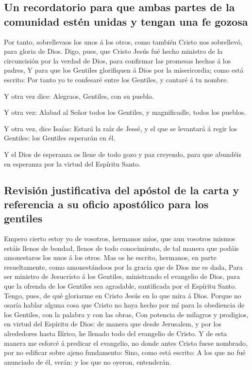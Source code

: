 \hypertarget{un-recordatorio-para-que-ambas-partes-de-la-comunidad-estuxe9n-unidas-y-tengan-una-fe-gozosa}{%
\subsection{Un recordatorio para que ambas partes de la comunidad estén
unidas y tengan una fe
gozosa}\label{un-recordatorio-para-que-ambas-partes-de-la-comunidad-estuxe9n-unidas-y-tengan-una-fe-gozosa}}

 Por tanto, sobrellevaos los unos á los otros, como también
Cristo nos sobrellevó, para gloria de Dios.  Digo, pues, que
Cristo Jesús fué hecho ministro de la circuncisión por la verdad de
Dios, para confirmar las promesas hechas á los padres,  Y
para que los Gentiles glorifiquen á Dios por la misericordia; como está
escrito: Por tanto yo te confesaré entre los Gentiles, y cantaré á tu
nombre.

 Y otra vez dice: Alegraos, Gentiles, con su pueblo.

 Y otra vez: Alabad al Señor todos los Gentiles, y
magnificadle, todos los pueblos.

 Y otra vez, dice Isaías: Estará la raíz de Jessé, y el que
se levantará á regir los Gentiles: los Gentiles esperarán en él.

 Y el Dios de esperanza os llene de todo gozo y paz
creyendo, para que abundéis en esperanza por la virtud del Espíritu
Santo.

\hypertarget{revisiuxf3n-justificativa-del-apuxf3stol-de-la-carta-y-referencia-a-su-oficio-apostuxf3lico-para-los-gentiles}{%
\subsection{Revisión justificativa del apóstol de la carta y referencia
a su oficio apostólico para los
gentiles}\label{revisiuxf3n-justificativa-del-apuxf3stol-de-la-carta-y-referencia-a-su-oficio-apostuxf3lico-para-los-gentiles}}

 Empero cierto estoy yo de vosotros, hermanos míos, que aun
vosotros mismos estáis llenos de bondad, llenos de todo conocimiento, de
tal manera que podáis amonestaros los unos á los otros. 
Mas os he escrito, hermanos, en parte resueltamente, como amonestándoos
por la gracia que de Dios me es dada,  Para ser ministro de
Jesucristo á los Gentiles, ministrando el evangelio de Dios, para que la
ofrenda de los Gentiles sea agradable, santificada por el Espíritu
Santo.  Tengo, pues, de qué gloriarme en Cristo Jesús en lo
que mira á Dios.  Porque no osaría hablar alguna cosa que
Cristo no haya hecho por mí para la obediencia de los Gentiles, con la
palabra y con las obras,  Con potencia de milagros y
prodigios, en virtud del Espíritu de Dios: de manera que desde
Jerusalem, y por los alrededores hasta Ilírico, he llenado todo del
evangelio de Cristo.  Y de esta manera me esforcé á
predicar el evangelio, no donde antes Cristo fuese nombrado, por no
edificar sobre ajeno fundamento:  Sino, como está escrito:
A los que no fué anunciado de él, verán: y los que no oyeron,
entenderán.

